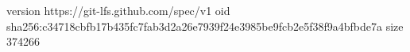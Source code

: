 version https://git-lfs.github.com/spec/v1
oid sha256:c34718cbfb17b435fc7fab3d2a26e7939f24e3985be9fcb2e5f38f9a4bfbde7a
size 374266
